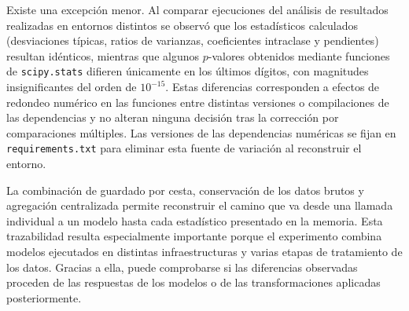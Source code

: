 Existe una excepción menor. Al comparar ejecuciones del análisis de resultados realizadas en entornos distintos se observó que los estadísticos calculados (desviaciones típicas, ratios de varianzas, coeficientes intraclase y pendientes) resultan idénticos, mientras que algunos $p$-valores obtenidos mediante funciones de \texttt{scipy.stats} difieren únicamente en los últimos dígitos, con magnitudes insignificantes del orden de $10^{-15}$. Estas diferencias corresponden a efectos de redondeo numérico en las funciones entre distintas versiones o compilaciones de las dependencias y no alteran ninguna decisión tras la corrección por comparaciones múltiples. Las versiones de las dependencias numéricas se fijan en \texttt{requirements.txt} para eliminar esta fuente de variación al reconstruir el entorno.

La combinación de guardado por cesta, conservación de los datos brutos y agregación centralizada permite reconstruir el camino que va desde una llamada individual a un modelo hasta cada estadístico presentado en la memoria. Esta trazabilidad resulta especialmente importante porque el experimento combina modelos ejecutados en distintas infraestructuras y varias etapas de tratamiento de los datos. Gracias a ella, puede comprobarse si las diferencias observadas proceden de las respuestas de los modelos o de las transformaciones aplicadas posteriormente.
